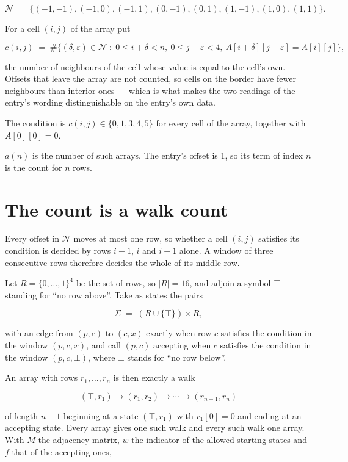 \documentclass[11pt]{article}
\theoremstyle{definition}
\begin{document}
\[\mathcal{N} \;=\; \{(-1,-1), (-1,0), (-1,1), (0,-1), (0,1), (1,-1), (1,0), (1,1)\}.\]

For a cell $(i,j)$ of the array put

\[c(i,j) \;=\; \#\bigl\{(\delta,\varepsilon)\in\mathcal{N} \;:\; 0\le i+\delta<n,\ 0\le j+\varepsilon<4,\ A[i+\delta][j+\varepsilon] = A[i][j]\bigr\},\]

the number of neighbours of the cell whose value is equal to the cell's own. Offsets that leave the array are not counted, so cells on the border have fewer neighbours than interior ones --- which is what makes the two readings of the entry's wording distinguishable on the entry's own data.

The condition is $c(i,j) \in \{0, 1, 3, 4, 5\}$ for every cell of the array, together with $A[0][0]=0$.

$a(n)$ is the number of such arrays. The entry's offset is 1, so its term of index $n$ is the count for $n$ rows.

\section{The count is a walk count}

Every offset in $\mathcal{N}$ moves at most one row, so whether a cell $(i,j)$ satisfies its condition is decided by rows $i-1$, $i$ and $i+1$ alone. A window of three consecutive rows therefore decides the whole of its middle row.

Let $R = \{0,\dots,1\}^{4}$ be the set of rows, so $|R| = 16$, and adjoin a symbol $\top$ standing for ``no row above''. Take as states the pairs

\[\Sigma \;=\; (R \cup \{\top\}) \times R,\]

with an edge from $(p,c)$ to $(c,x)$ exactly when row $c$ satisfies the condition in the window $(p,c,x)$, and call $(p,c)$ accepting when $c$ satisfies the condition in the window $(p,c,\bot)$, where $\bot$ stands for ``no row below''.

An array with rows $r_1,\dots,r_n$ is then exactly a walk

\[(\top,r_1) \to (r_1,r_2) \to \cdots \to (r_{n-1},r_n)\]

of length $n-1$ beginning at a state $(\top,r_1)$ with $r_1[0]=0$ and ending at an accepting state. Every array gives one such walk and every such walk one array. With $M$ the adjacency matrix, $w$ the indicator of the allowed starting states and $f$ that of the accepting ones,
\end{document}
